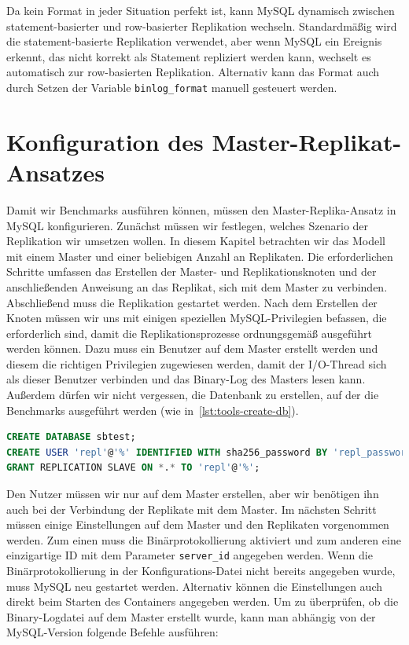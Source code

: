Da kein Format in jeder Situation perfekt ist, kann MySQL dynamisch zwischen statement-basierter und row-basierter Replikation wechseln.
Standardmäßig wird die statement-basierte Replikation verwendet, aber wenn MySQL ein Ereignis erkennt, das nicht korrekt als Statement repliziert werden kann, wechselt es automatisch zur row-basierten Replikation.
Alternativ kann das Format auch durch Setzen der Variable \texttt{binlog\_format} manuell gesteuert werden.

\section{Konfiguration des Master-Replikat-Ansatzes}\label{sec:replication-konfiguration}

Damit wir Benchmarks ausführen können, müssen den Master-Replika-Ansatz in MySQL konfigurieren.
Zunächst müssen wir festlegen, welches Szenario der Replikation wir umsetzen wollen.
In diesem Kapitel betrachten wir das Modell mit einem Master und einer beliebigen Anzahl an Replikaten.
Die erforderlichen Schritte umfassen das Erstellen der Master- und Replikationsknoten und der anschließenden Anweisung an das Replikat, sich mit dem Master zu verbinden.
Abschließend muss die Replikation gestartet werden.
Nach dem Erstellen der Knoten müssen wir uns mit einigen speziellen MySQL-Privilegien befassen, die erforderlich sind, damit die Replikationsprozesse ordnungsgemäß ausgeführt werden können.
Dazu muss ein Benutzer auf dem Master erstellt werden und diesem die richtigen Privilegien zugewiesen werden, damit der I/O-Thread sich als dieser Benutzer verbinden und das Binary-Log des Masters lesen kann.
Außerdem dürfen wir nicht vergessen, die Datenbank zu erstellen, auf der die Benchmarks ausgeführt werden (wie in~\ref{lst:tools-create-db}).

\vspace{-7pt}
\begin{lstlisting}[language=SQL,caption=Datenbank- und Nutzererstellung sowie Rechtevergabe,label={lst:replication-privileges}]
CREATE DATABASE sbtest;
CREATE USER 'repl'@'%' IDENTIFIED WITH sha256_password BY 'repl_password';
GRANT REPLICATION SLAVE ON *.* TO 'repl'@'%';
\end{lstlisting}
\vspace{-5pt}

Den Nutzer müssen wir nur auf dem Master erstellen, aber wir benötigen ihn auch bei der Verbindung der Replikate mit dem Master.
Im nächsten Schritt müssen einige Einstellungen auf dem Master und den Replikaten vorgenommen werden.
Zum einen muss die Binärprotokollierung aktiviert und zum anderen eine einzigartige ID mit dem Parameter \texttt{server\_id} angegeben werden.
Wenn die Binärprotokollierung in der Konfigurations-Datei nicht bereits angegeben wurde, muss MySQL neu gestartet werden.
Alternativ können die Einstellungen auch direkt beim Starten des Containers angegeben werden.
Um zu überprüfen, ob die Binary-Logdatei auf dem Master erstellt wurde, kann man abhängig von der MySQL-Version folgende Befehle ausführen:

